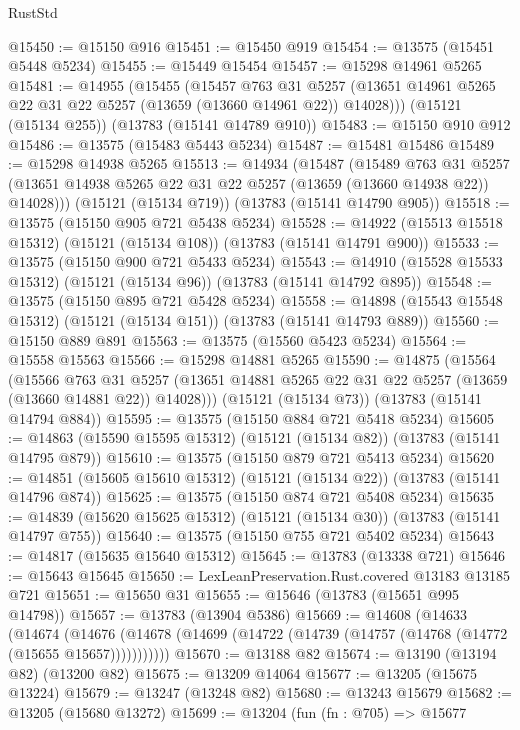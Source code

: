\begin{lexlean}{RustStd}
\begin{coremodule}
@15450 := @15150 @916
@15451 := @15450 @919
@15454 := @13575 (@15451 @5448 @5234)
@15455 := @15449 @15454
@15457 := @15298 @14961 @5265
@15481 := @14955
    (@15455
      (@15457
        @763
        @31
        @5257
        (@13651 @14961 @5265 @22 @31 @22 @5257 (@13659 (@13660 @14961 @22)) @14028)))
    (@15121 (@15134 @255))
    (@13783 (@15141 @14789 @910))
@15483 := @15150 @910 @912
@15486 := @13575 (@15483 @5443 @5234)
@15487 := @15481 @15486
@15489 := @15298 @14938 @5265
@15513 := @14934
    (@15487
      (@15489
        @763
        @31
        @5257
        (@13651 @14938 @5265 @22 @31 @22 @5257 (@13659 (@13660 @14938 @22)) @14028)))
    (@15121 (@15134 @719))
    (@13783 (@15141 @14790 @905))
@15518 := @13575 (@15150 @905 @721 @5438 @5234)
@15528 := @14922 (@15513 @15518 @15312) (@15121 (@15134 @108)) (@13783 (@15141 @14791 @900))
@15533 := @13575 (@15150 @900 @721 @5433 @5234)
@15543 := @14910 (@15528 @15533 @15312) (@15121 (@15134 @96)) (@13783 (@15141 @14792 @895))
@15548 := @13575 (@15150 @895 @721 @5428 @5234)
@15558 := @14898 (@15543 @15548 @15312) (@15121 (@15134 @151)) (@13783 (@15141 @14793 @889))
@15560 := @15150 @889 @891
@15563 := @13575 (@15560 @5423 @5234)
@15564 := @15558 @15563
@15566 := @15298 @14881 @5265
@15590 := @14875
    (@15564
      (@15566
        @763
        @31
        @5257
        (@13651 @14881 @5265 @22 @31 @22 @5257 (@13659 (@13660 @14881 @22)) @14028)))
    (@15121 (@15134 @73))
    (@13783 (@15141 @14794 @884))
@15595 := @13575 (@15150 @884 @721 @5418 @5234)
@15605 := @14863 (@15590 @15595 @15312) (@15121 (@15134 @82)) (@13783 (@15141 @14795 @879))
@15610 := @13575 (@15150 @879 @721 @5413 @5234)
@15620 := @14851 (@15605 @15610 @15312) (@15121 (@15134 @22)) (@13783 (@15141 @14796 @874))
@15625 := @13575 (@15150 @874 @721 @5408 @5234)
@15635 := @14839 (@15620 @15625 @15312) (@15121 (@15134 @30)) (@13783 (@15141 @14797 @755))
@15640 := @13575 (@15150 @755 @721 @5402 @5234)
@15643 := @14817 (@15635 @15640 @15312)
@15645 := @13783 (@13338 @721)
@15646 := @15643 @15645
@15650 := LexLeanPreservation.Rust.covered @13183 @13185 @721
@15651 := @15650 @31
@15655 := @15646 (@13783 (@15651 @995 @14798))
@15657 := @13783 (@13904 @5386)
@15669 := @14608
    (@14633
      (@14674
        (@14676 (@14678 (@14699 (@14722 (@14739 (@14757 (@14768 (@14772 (@15655 @15657)))))))))))
@15670 := @13188 @82
@15674 := @13190 (@13194 @82) (@13200 @82)
@15675 := @13209 @14064
@15677 := @13205 (@15675 @13224)
@15679 := @13247 (@13248 @82)
@15680 := @13243 @15679
@15682 := @13205 (@15680 @13272)
@15699 := @13204
    (fun (fn : @705) =>
    @15677

\end{coremodule}
\end{lexlean}
